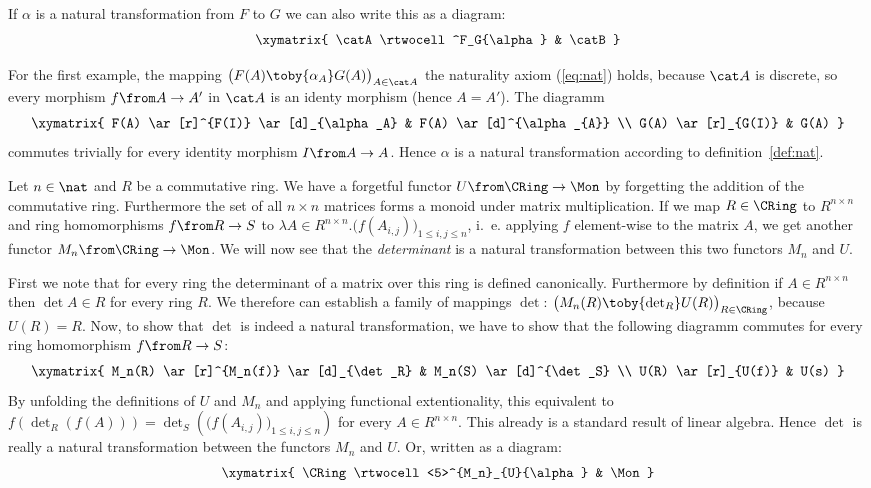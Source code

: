 If $\alpha$ is a natural transformation from $F$ to $G$ we can also write this as a diagram:
\[\xymatrix{
  \catA \rtwocell^F_G{\alpha} & \catB
}\]

\begin{exmp}
  For the first example, the mapping
  $\bigl(F(A)\toby{\alpha_A}G(A)\bigr)_{A\in\catA}$
  the naturality axiom (\ref{eq:nat}) holds, because $\catA$ is discrete, so every morphism $f \from A \to A'$ in $\catA$ is an identy morphism (hence $A=A'$). The diagramm
  \[
    \xymatrix{
      F(A) \ar[r]^{F(I)} \ar[d]_{\alpha_A} & F(A) \ar[d]^{\alpha_{A}} \\
      G(A) \ar[r]_{G(I)} & G(A)
  }\]
  commutes trivially for every identity morphism $I \from A \to A$. Hence $\alpha$ is a natural transformation according to definition~\ref{def:nat}.
\end{exmp}

\begin{exmp}
  Let $n\in\nat$ and $R$ be a commutative ring.
  We have a forgetful functor $U \from \CRing \to \Mon$ by forgetting the addition of the commutative ring.
  Furthermore the set of all $n \times n$ matrices forms a monoid under matrix multiplication.
  If we map $R \in \CRing$ to $R^{n \times n}$ and ring homomorphisms $f \from R \to S$ to
  $\lambda A \in R^{n \times n}. \bigl( f(A_{i,j}) \bigr)_{1 \le i, j \le n}$,
  i.~e. applying $f$ element-wise to the matrix $A$, we get another functor $M_n \from \CRing \to \Mon$.
  We will now see that the \emph{determinant} is a natural transformation between this two functors $M_n$ and $U$.

  First we note that for every ring the determinant of a matrix over this ring is defined canonically.
  Furthermore by definition if $A \in R^{n \times n}$ then $\det A \in R$ for every ring $R$.
  We therefore can establish a family of mappings $\det$:
  $\bigl(M_n(R)\toby{\det_R}U(R)\bigr)_{R\in\CRing}$, because $U(R) = R$.
  Now, to show that $\det$ is indeed a natural transformation, we have to show that the following diagramm commutes for every ring homomorphism $f \from R \to S$:
  \[\xymatrix{
    M_n(R) \ar[r]^{M_n(f)} \ar[d]_{\det_R} & M_n(S) \ar[d]^{\det_S} \\
    U(R) \ar[r]_{U(f)} & U(s)
  }\]
  By unfolding the definitions of $U$ and $M_n$ and applying functional extentionality, this equivalent to
  $f(\det_R(f(A))) = \det_S (\bigl( f(A_{i,j}) \bigr)_{1 \le i, j \le n})$
  for every $A \in R^{n \times n}$.
  This already is a standard result of linear algebra.
  Hence $\det$ is really a natural transformation between the functors $M_n$ and $U$. Or, written as a diagram:
  \[\xymatrix{
    \CRing \rtwocell<5>^{M_n}_{U}{\alpha} & \Mon
  }\]
\end{exmp}

